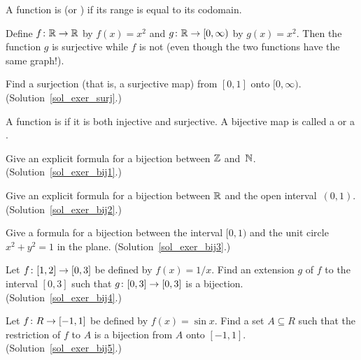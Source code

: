 \begin{defn}  A function is
 (or
) if its range is equal to its codomain.
\end{defn}

\begin{exam}  Define $f\colon \mathbb{R} \rightarrow \mathbb{R}$ by $f(x) = x^2$ and $g\colon \mathbb{R} \rightarrow [0, \infty)$
by $g(x) = x^2$.  Then the function $g$ is surjective while $f$ is not (even though the two
functions have the same graph!).
\end{exam}

\begin{exer}\label{exer_surj}  Find a surjection (that is, a surjective map) from $[0,1]$
onto $[0, \infty)$.
(Solution~\ref{sol_exer_surj}.)
\end{exer}

\begin{defn}  A function is
 if it is both injective and surjective. A bijective
map is called a
 or a
.
\end{defn}

\begin{exer}\label{exer_bij1}  Give an explicit formula for a bijection between $\mathbb{Z}$ and~$\mathbb{N}$.
(Solution~\ref{sol_exer_bij1}.)
\end{exer}

\begin{exer}\label{exer_bij2} Give an explicit formula for a bijection between $\mathbb{R}$ and the open
interval~$(0,1)$.
(Solution~\ref{sol_exer_bij2}.)
\end{exer}

\begin{exer}\label{exer_bij3}  Give a formula for a bijection between the interval $[0,1)$ and the
unit circle $x^2 + y^2 = 1$ in the plane.
(Solution~\ref{sol_exer_bij3}.)
\end{exer}

\begin{exer}\label{exer_bij4} Let $f\colon [1,2] \rightarrow [0,3]$ be defined by $f(x) = 1/x$. Find an
extension $g$ of $f$ to the interval $[0,3]$ such that $g\colon [0, 3] \rightarrow [0,3]$ is a
bijection. (Solution~\ref{sol_exer_bij4}.)
\end{exer}

\begin{exer}\label{exer_bij5}  Let $f\colon R \rightarrow [-1,1]$ be defined by $f(x) = \sin x$. Find a set
$A \subseteq R$ such that the restriction of $f$ to $A$ is a bijection from $A$ onto $[-1,1]$.
(Solution~\ref{sol_exer_bij5}.)
\end{exer}

